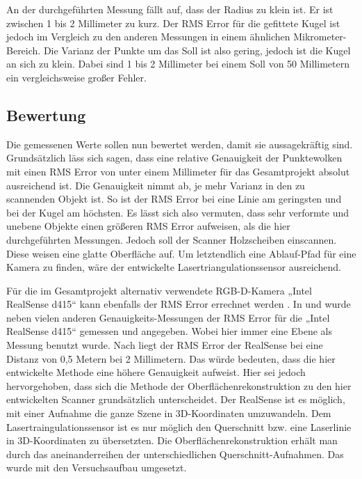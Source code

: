 		An der durchgeführten Messung fällt auf, dass der Radius zu klein ist. Er ist zwischen 1 bis 2 Millimeter zu kurz. Der RMS Error für die gefittete Kugel ist jedoch im Vergleich zu den anderen Messungen in einem ähnlichen Mikrometer-Bereich. Die Varianz der Punkte um das \glqq Soll\grqq{} ist also gering, jedoch ist die Kugel an sich zu klein. Dabei sind 1 bis 2 Millimeter bei einem Soll von 50 Millimetern ein vergleichsweise großer Fehler. 
		
		\subsection{Bewertung}
		
		Die gemessenen Werte sollen nun bewertet werden, damit sie aussagekräftig sind. Grundsätzlich läss sich sagen, dass eine relative Genauigkeit der Punktewolken mit einen RMS Error von unter einem Millimeter für das Gesamtprojekt absolut ausreichend ist. Die Genauigkeit nimmt ab, je mehr Varianz in den zu scannenden Objekt ist. So ist der RMS Error bei eine Linie am geringsten und bei der Kugel am höchsten. Es lässt sich also vermuten, dass sehr verformte und unebene Objekte einen größeren RMS Error aufweisen, als die hier durchgeführten Messungen. Jedoch soll der Scanner Holzscheiben einscannen. Diese weisen eine glatte Oberfläche auf. Um letztendlich eine Ablauf-Pfad für eine Kamera zu finden, wäre der entwickelte Lasertriangulationssensor ausreichend.

		Für die im Gesamtprojekt alternativ verwendete RGB-D-Kamera „Intel RealSense d415“ kann ebenfalls der RMS Error errechnet werden \citep[Vgl.][]{noauthor_camera_nodate-1}. In \citep{grunnet-jepsen_best-known-methods_nodate} und \citep{lourenco_intel_2021} wurde neben vielen anderen Genauigkeits-Messungen der RMS Error für die „Intel RealSense d415“ gemessen und angegeben. Wobei hier immer eine Ebene als Messung benutzt wurde. Nach \citep{lourenco_intel_2021} liegt der RMS Error der RealSense bei eine Distanz von 0,5 Metern bei 2 Millimetern. Das würde bedeuten, dass die hier entwickelte Methode eine höhere Genauigkeit aufweist. Hier sei jedoch hervorgehoben, dass sich die Methode der Oberflächenrekonstruktion zu den hier entwickelten Scanner grundsätzlich unterscheidet. Der RealSense ist es möglich, mit einer Aufnahme die ganze Szene in 3D-Koordinaten umzuwandeln. Dem Lasertraingulationssensor ist es nur möglich den Querschnitt bzw. eine Laserlinie in 3D-Koordinaten zu übersetzten. Die Oberflächenrekonstruktion erhält man durch das aneinanderreihen der unterschiedlichen Querschnitt-Aufnahmen. Das wurde mit den Versuchsaufbau umgesetzt.
		
